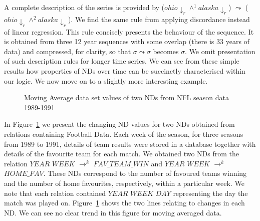 \smallskip
A complete description of the series is provided by ($ohio\downarrow_r
\wedge^1 alaska\downarrow_r$) $\leadsto$ ($ohio\downarrow_r
\wedge^2 alaska\downarrow_r$). We find the same rule from applying
discordance instead of linear regression. This rule concisely presents
the behaviour of the sequence. It is obtained from three 12 year sequences
with some overlap (there is 33 years of data) and compressed, for
clarity, so that $\sigma \leadsto \sigma$
becomes $\sigma$. We  
omit presentation of such description rules for longer time series.
We can see from these simple results how properties of NDs over time
can be succinctly characterised within our logic. We now move on to a
slightly more interesting example.

\medskip



\begin{figure}
\centerline{}
\caption{\label{graph:profb_1}{Moving Average data set values of two NDs
from NFL season data 1989-1991}}
\end{figure}



In Figure~\ref{graph:profb_1} we present the changing ND values for
two NDs obtained from relations containing Football Data. Each week of
the season, for three seasons from 1989 to 1991, details of team
results were stored in a database together with details of the
favourite team for each match. We obtained two NDs from the relation
$YEAR$  $WEEK$ $\to^k$ $FAV\_TEAM\_WIN$ and $YEAR$  $WEEK$ $\to^k$
$HOME\_FAV$. These NDs correspond to the number of favoured teams
winning and the number of home favourites, respectively, within a
particular week.
We note that each relation contained $YEAR$  $WEEK$
 $DAY$ representing the day the match was played
on. Figure~\ref{graph:profb_1} shows
the two lines relating to changes in each ND. We can see no clear
trend in this figure for moving averaged data.

